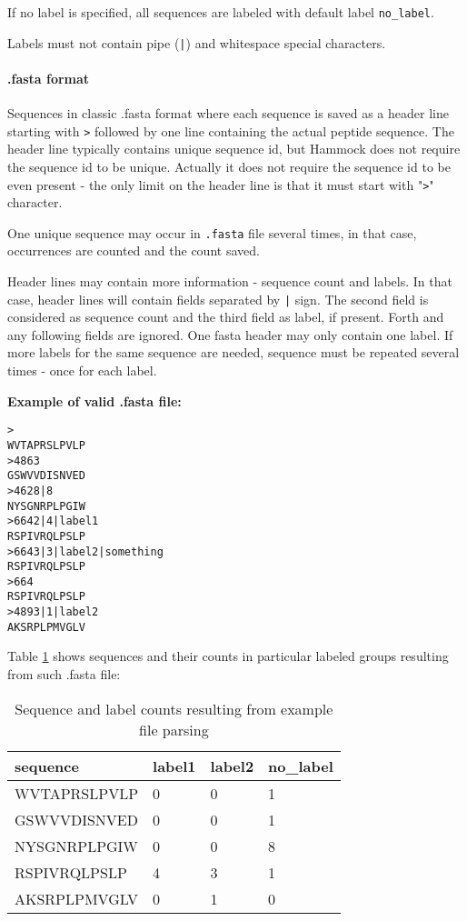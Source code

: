 \documentclass[11pt, a4paper, twoside, titlepage]{article}
\begin{document}
If no label is specified, all sequences are labeled with default label \texttt{no\_label}.

Labels must not contain pipe (\texttt{|}) and whitespace special characters.

\paragraph{.fasta format}\label{fastaFormat}
Sequences in classic .fasta format where each sequence is saved as a header line starting with \texttt{>} followed by one line containing the actual peptide sequence. The header line typically contains unique sequence id, but Hammock does not require the sequence id to be unique. Actually it does not require the sequence id to be even present - the only limit on the header line is that it must start with "\texttt{>}" character.

One unique sequence may occur in \texttt{.fasta} file several times, in that case, occurrences are counted and the count saved. 

Header lines may contain more information - sequence count and labels. In that case, header lines will contain fields separated by \texttt{|} sign. The second field is considered as sequence count and the third field as label, if present. Forth and any following fields are ignored. One fasta header may only contain one label. If more labels for the same sequence are needed, sequence must be repeated several times - once for each label.  \newline 

\textbf{Example of valid .fasta file:} 

\begin{verbatim}
>
WVTAPRSLPVLP
>4863
GSWVVDISNVED
>4628|8
NYSGNRPLPGIW
>6642|4|label1
RSPIVRQLPSLP
>6643|3|label2|something
RSPIVRQLPSLP
>664
RSPIVRQLPSLP
>4893|1|label2
AKSRPLPMVGLV
\end{verbatim}

Table \ref{tab1} shows sequences and their counts in particular labeled groups resulting from such .fasta file: 

\begin{table}[h]
\begin{tabular}{|l|l|l|l|}
\hline
sequence     & label1 & label2 & no\_label \\ \hline
WVTAPRSLPVLP & 0      & 0      & 1         \\
GSWVVDISNVED & 0      & 0      & 1         \\
NYSGNRPLPGIW & 0      & 0      & 8         \\
RSPIVRQLPSLP & 4      & 3      & 1         \\
AKSRPLPMVGLV & 0      & 1      & 0         \\ \hline
\end{tabular}
\label{tab1}
\caption{Sequence and label counts resulting from example file parsing}
\end{table}
\end{document}
